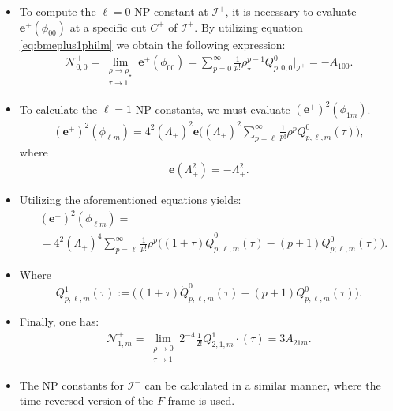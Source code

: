 \documentclass{beamer}
\theoremstyle{remark}
\theoremstyle{plain}
\theoremstyle{plain}
\begin{document}
\begin{frame}
  \begin{itemize}
    \item To compute the $\ell=0$ NP constant at $\mathscr{I}^{+}$, it is necessary to evaluate $\boldsymbol{e}^{+}(\phi_{00})$ at a specific cut ${C}^{+}$ of $\mathscr{I}^{+}$. By utilizing equation \eqref{eq:bmeplus1philm} we obtain the following expression:
    \begin{align}
      \mathcal{N}^{+}_{0,0}= \lim_{\substack{\rho \to \rho_{\star} \\ \tau \to 1}}  \boldsymbol{e}^{+}(\phi_{00}) =\sum_{p=0}^{\infty} \frac{1}{p!}\rho^{p-1}_{\star}Q^{0}_{p,0,0}|_{\mathscr{I}^{+}} = -A_{100}.
    \end{align}
    \item To calculate the $\ell = 1$ NP constants, we must evaluate $(\boldsymbol{e}^{+})^{2}(\phi_{1m})$.\\
    \begin{align}\label{eq:bmeplus2philmraw}
      (\boldsymbol{e}^{+})^2(\phi_{\ell m})= 4^2(\Lambda_{+})^{2}\boldsymbol{e} \Big((\Lambda_{+}{})^2 \sum_{p=\ell}^{\infty}\frac{1}{p!}\rho^{p}Q^{0}_{p,\ell,m}(\tau)\Big),
    \end{align}
    where
    \begin{align}\label{eq:defQ1}
      \boldsymbol{e}\left(\Lambda_{+}^{2}\right)= -\Lambda_{+}^{2}.
    \end{align}
    \item Utilizing the aforementioned equations yields:
    \begin{align}\label{eq:defQ1}
      & (\boldsymbol{e}^{+})^2(\phi_{\ell m})= \nonumber \\
      & = 4^2(\Lambda_{+})^{4}\sum_{p=\ell}^{\infty} \frac{1}{p!}\rho^{p}\big((1+\tau)\dot{Q}^{0}_{p;\ell,m}(\tau)-(p+1){Q}^{0}_{p;\ell,m}(\tau)\big).
    \end{align}
  \end{itemize}
\end{frame}

\begin{frame}
  \begin{itemize}
    \item Where
    \begin{equation}
      Q^{1}_{p,\ell,m}(\tau):= \big((1+\tau)\dot{Q}^{0}_{p,\ell,m}(\tau)-(p+1){Q}^{0}_{p,\ell,m}(\tau)\big).
    \end{equation}
    \item Finally, one has:
    \begin{align}
      \mathcal{N}^{+}_{1,m} = \lim _{\substack{\rho \rightarrow 0 \\ \tau \rightarrow 1}}2^{-4} \frac{1}{2 !} Q^{1}_{2, 1, m}\cdot(\tau) = 3A_{21m}.
    \end{align}
    \item The NP constants for $\mathscr{I}^{-}$ can be calculated in a similar manner, where the time reversed version of the $F$-frame is used.
  \end{itemize}
\end{frame}
\end{document}
